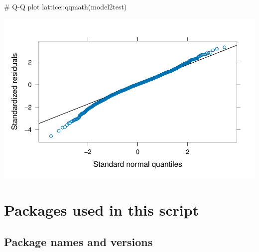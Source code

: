\documentclass[
  letterpaper,
  DIV=11,
  numbers=noendperiod]{scrreprt}
\newenvironment{Shaded}{\begin{snugshade}}{\end{snugshade}}
\newcommand{\CommentTok}[1]{\textcolor[rgb]{0.37,0.37,0.37}{#1}}
\newcommand{\FunctionTok}[1]{\textcolor[rgb]{0.28,0.35,0.67}{#1}}
\newcommand{\NormalTok}[1]{\textcolor[rgb]{0.00,0.23,0.31}{#1}}
\newcommand{\SpecialCharTok}[1]{\textcolor[rgb]{0.37,0.37,0.37}{#1}}
\begin{document}
\begin{Shaded}
\begin{Highlighting}[]
\CommentTok{\# Q{-}Q plot}
\NormalTok{lattice}\SpecialCharTok{::}\FunctionTok{qqmath}\NormalTok{(model2test)}
\end{Highlighting}
\end{Shaded}

\includegraphics{AppendixF_files/figure-pdf/lmer-diagnostics-3.pdf}

\section{Packages used in this
script}\label{packages-used-in-this-script-2}

\subsection{Package names and
versions}\label{package-names-and-versions-2}
\end{document}
